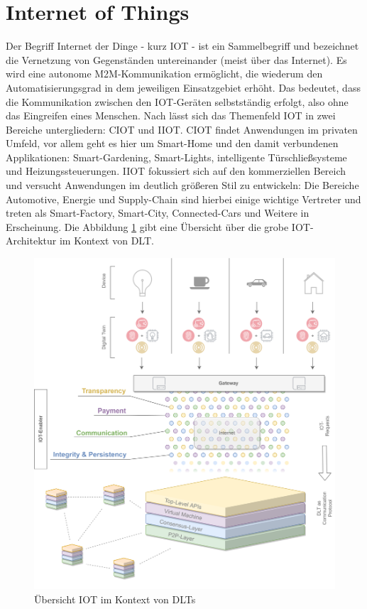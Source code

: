 %
%
\section{Internet of Things}
\label{sec:fundamentals:iot}
Der Begriff Internet der Dinge - kurz \ac{IOT} - ist ein Sammelbegriff und bezeichnet die Vernetzung von Gegenständen untereinander (meist über das Internet). Es wird eine autonome \ac{M2M}-Kommunikation ermöglicht, die wiederum den Automatisierungsgrad in dem jeweiligen Einsatzgebiet erhöht. Das bedeutet, dass die Kommunikation zwischen den \ac{IOT}-Geräten selbstständig erfolgt, also ohne das Eingreifen eines Menschen. Nach \cite{deloitte2018} lässt sich das Themenfeld \ac{IOT} in zwei Bereiche untergliedern: \ac{CIOT} und \ac{IIOT}. \ac{CIOT} findet Anwendungen im privaten Umfeld, vor allem geht es hier um Smart-Home und den damit verbundenen Applikationen: Smart-Gardening, Smart-Lights, intelligente Türschließsysteme und Heizungssteuerungen. \ac{IIOT} fokussiert sich auf den kommerziellen Bereich und versucht Anwendungen im deutlich größeren Stil zu entwickeln: Die Bereiche Automotive, Energie und Supply-Chain sind hierbei einige wichtige Vertreter und treten als Smart-Factory, Smart-City, Connected-Cars und Weitere in Erscheinung. Die Abbildung \ref{fig:chapter02:overview-iot} gibt eine Übersicht über die grobe \ac{IOT}-Architektur im Kontext von \ac{DLT}.

\begin{figure}[h]
 \centering
 \includegraphics[width=1.0\textwidth]{gfx/Overview-IOT.png}
 \caption{Übersicht IOT im Kontext von DLTs}
 \label{fig:chapter02:overview-iot}
\end{figure}

